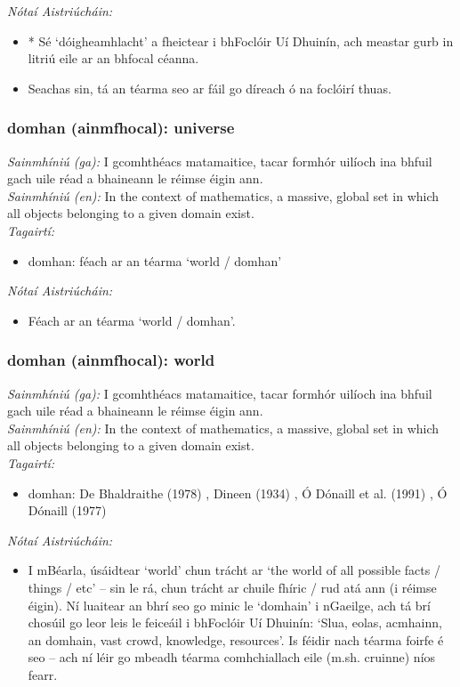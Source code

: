  \noindent \textit{Nótaí Aistriúcháin:}
\begin{itemize}
	\item * Sé `dóigheamhlacht' a fheictear i bhFoclóir Uí Dhuinín, ach meastar gurb in litriú eile ar an bhfocal céanna.
	\item Seachas sin, tá an téarma seo ar fáil go díreach ó na foclóirí thuas.
\end{itemize}


\subsubsection*{domhan (ainmfhocal): universe}
 \noindent \textit{Sainmhíniú (ga):} I gcomhthéacs matamaitice, tacar formhór uilíoch ina bhfuil gach uile réad a bhaineann le réimse éigin ann.
\\
 \noindent \textit{Sainmhíniú (en):} In the context of mathematics, a massive, global set in which all objects belonging to a given domain exist.
\\
 \noindent \textit{Tagairtí:}
\begin{itemize}
	\item domhan: féach ar an téarma `world / domhan'
\end{itemize}

 \noindent \textit{Nótaí Aistriúcháin:}
\begin{itemize}
	\item Féach ar an téarma `world / domhan'.
\end{itemize}


\subsubsection*{domhan (ainmfhocal): world}
 \noindent \textit{Sainmhíniú (ga):} I gcomhthéacs matamaitice, tacar formhór uilíoch ina bhfuil gach uile réad a bhaineann le réimse éigin ann.
\\
 \noindent \textit{Sainmhíniú (en):} In the context of mathematics, a massive, global set in which all objects belonging to a given domain exist.
\\
 \noindent \textit{Tagairtí:}
\begin{itemize}
	\item domhan: De Bhaldraithe (1978) \cite{de-bhaldraithe}, Dineen (1934) \cite{dineen}, Ó Dónaill et al. (1991) \cite{focloir-beag}, Ó Dónaill (1977) \cite{odonaill}
\end{itemize}

 \noindent \textit{Nótaí Aistriúcháin:}
\begin{itemize}
	\item I mBéarla, úsáidtear `world' chun trácht ar `the world of all possible facts / things / etc' -- sin le rá, chun trácht ar chuile fhíric / rud atá ann (i réimse éigin). Ní luaitear an bhrí seo go minic le `domhain' i nGaeilge, ach tá brí chosúil go leor leis le feiceáil i bhFoclóir Uí Dhuinín: `Slua, eolas, acmhainn, an domhain, vast crowd, knowledge, resources'. Is féidir nach téarma foirfe é seo -- ach ní léir go mbeadh téarma comhchiallach eile (m.sh. cruinne) níos fearr.
\end{itemize}



